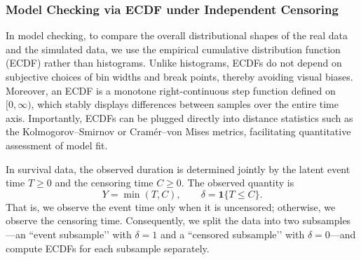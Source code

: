 \subsubsection{Model Checking via ECDF under Independent Censoring}
In model checking, to compare the overall distributional shapes of the real data and the simulated data, we use the empirical cumulative distribution function (ECDF) rather than histograms. Unlike histograms, ECDFs do not depend on subjective choices of bin widths and break points, thereby avoiding visual biases. Moreover, an ECDF is a monotone right-continuous step function defined on $[0,\infty)$, which stably displays differences between samples over the entire time axis. Importantly, ECDFs can be plugged directly into distance statistics such as the Kolmogorov–Smirnov or Cramér–von Mises metrics, facilitating quantitative assessment of model fit.

In survival data, the observed duration is determined jointly by the latent event time $T\ge 0$ and the censoring time $C\ge 0$. The observed quantity is
$$
Y=\min(T,C),\qquad \delta=\mathbf 1\{T\le C\}.
$$
That is, we observe the event time only when it is uncensored; otherwise, we observe the censoring time. Consequently, we split the data into two subsamples—an “event subsample’’ with $\delta=1$ and a “censored subsample’’ with $\delta=0$—and compute ECDFs for each subsample separately.

